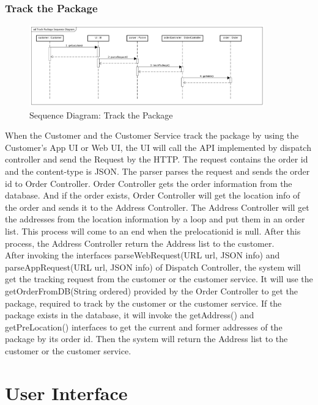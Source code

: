 \documentclass[12pt]{scrreprt}
\begin{document}
\subsection{Track the Package}
\begin{figure}[htbp]
	\centering\includegraphics[width=4in]{DocumentRes/8SequenceDiagram_track.png}
	\caption{Sequence Diagram: Track the Package}
\end{figure}
When the Customer and the Customer Service track the package by using the Customer's App UI or Web UI, the UI will call the API implemented by dispatch controller and send the Request by the HTTP. The request contains the order id and the content-type is JSON. The parser parses the request and sends the order id to Order Controller. Order Controller gets the order information from the database.                                                                                                                     And if the order exists, Order Controller will get the location info of the order and sends it to the Address Controller. The Address Controller will get the addresses from the location information by a loop and put them in an order list. This process will come to an end when the prelocationid is null. After this process, the Address Controller return the Address list to the customer.\\
After invoking the interfaces parseWebRequest(URL url, JSON info) and parseAppRequest(URL url, JSON info) of Dispatch Controller, the system will get the tracking request from the customer or the customer service. It will use the getOrderFromDB(String ordered) provided by the Order Controller to get the package, required to track by the customer or the customer service. If the package exists in the database, it will invoke the getAddress() and getPreLocation() interfaces to get the current and former addresses of the package by its order id. Then the system will return the Address list to the customer or the customer service.

\chapter{User Interface}
\end{document}
